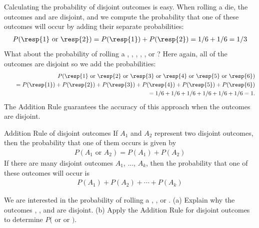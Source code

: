 Calculating the probability of disjoint outcomes is easy. When rolling a die, the outcomes  and  are disjoint, and we compute the probability that one of these outcomes will occur by adding their separate probabilities:
\begin{eqnarray*}
P(\text{\resp{1} or \resp{2}}) = P(\text{\resp{1}})+P(\text{\resp{2}}) = 1/6 + 1/6 = 1/3
\end{eqnarray*}
What about  the probability of rolling a , , , , , or ? Here again, all of the outcomes are disjoint so we add the probabilities:
\begin{eqnarray*}
&&P(\text{\resp{1} or \resp{2} or \resp{3} or \resp{4} or \resp{5} or \resp{6}}) \\
	&&\quad= P(\text{\resp{1}})+P(\text{\resp{2}})+P(\text{\resp{3}})+P(\text{\resp{4}})+P(\text{\resp{5}})+P(\text{\resp{6}}) \\
	&&\quad= 1/6 + 1/6 + 1/6 + 1/6 + 1/6 + 1/6 = 1.
\end{eqnarray*}
The Addition Rule guarantees the accuracy of this approach when the outcomes are disjoint.

\D{\newpage}

\begin{onebox}{Addition Rule of disjoint outcomes} If $A_1$ and $A_2$ represent two disjoint outcomes, then the probability that one of them occurs is given by
\begin{eqnarray*}
P(A_1\text{ or } A_2) = P(A_1) + P(A_2)
\end{eqnarray*}
If there are many disjoint outcomes $A_1$, ..., $A_k$, then the probability that one of these outcomes will occur is
\begin{eqnarray*}
P(A_1) + P(A_2) + \cdots + P(A_k)
\end{eqnarray*}
\end{onebox}

\begin{exercisewrap}
\begin{nexercise}
We are interested in the probability of rolling a , , or . (a) Explain why the outcomes , , and  are disjoint. (b) Apply the Addition Rule for disjoint outcomes to determine $P($ or  or $)$.\footnotemark
\end{nexercise}
\end{exercisewrap}

